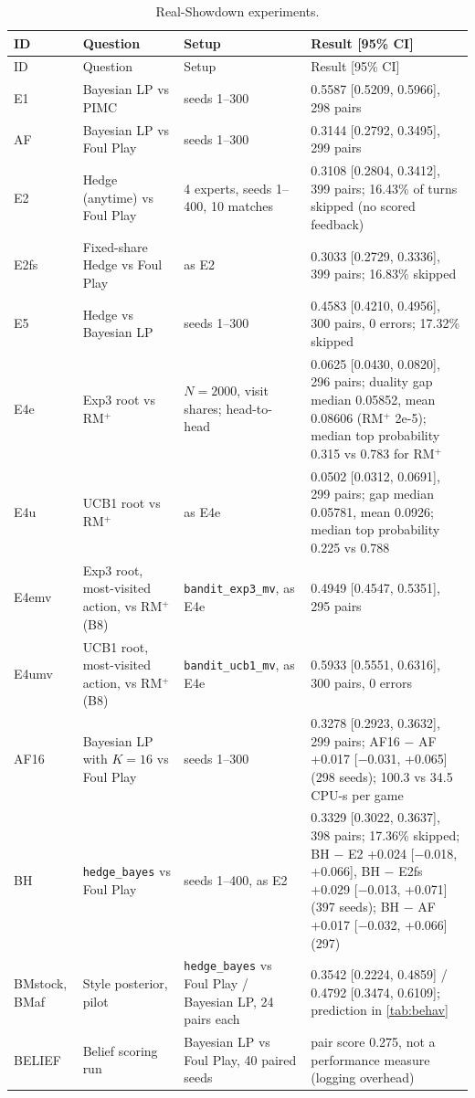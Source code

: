 \documentclass[10pt]{article}
\theoremstyle{plain}
\theoremstyle{definition}
\theoremstyle{remark}
\begin{document}
\begingroup\footnotesize\setlength{\tabcolsep}{3pt}
\begin{longtable}{@{}p{1.25cm}p{3.6cm}p{3.7cm}p{7.5cm}@{}}
\caption{Real-Showdown experiments.}\label{tab:showdown}\\
\toprule ID & Question & Setup & Result [95\% CI] \\ \midrule \endfirsthead
\toprule ID & Question & Setup & Result [95\% CI] \\ \midrule \endhead
E1 & Bayesian LP vs PIMC & seeds 1--300 & 0.5587 [0.5209, 0.5966], 298 pairs \\
AF & Bayesian LP vs Foul Play & seeds 1--300 & 0.3144 [0.2792, 0.3495], 299 pairs \\
E2 & Hedge (anytime) vs Foul Play & 4 experts, seeds 1--400, 10 matches & 0.3108 [0.2804, 0.3412], 399 pairs; 16.43\% of turns skipped (no scored feedback) \\
E2fs & Fixed-share Hedge vs Foul Play & as E2 & 0.3033 [0.2729, 0.3336], 399 pairs; 16.83\% skipped \\
E5 & Hedge vs Bayesian LP & seeds 1--300 & 0.4583 [0.4210, 0.4956], 300 pairs, 0 errors; 17.32\% skipped \\
E4e & Exp3 root vs RM$^+$ & $N=2000$, visit shares; head-to-head & 0.0625 [0.0430, 0.0820], 296 pairs; duality gap median 0.05852, mean 0.08606 (RM$^+$ 2e-5); median top probability 0.315 vs 0.783 for RM$^+$ \\
E4u & UCB1 root vs RM$^+$ & as E4e & 0.0502 [0.0312, 0.0691], 299 pairs; gap median 0.05781, mean 0.0926; median top probability 0.225 vs 0.788 \\
E4emv & Exp3 root, most-visited action, vs RM$^+$ (B8) & \texttt{bandit\_exp3\_mv}, as E4e & 0.4949 [0.4547, 0.5351], 295 pairs \\
E4umv & UCB1 root, most-visited action, vs RM$^+$ (B8) & \texttt{bandit\_ucb1\_mv}, as E4e & 0.5933 [0.5551, 0.6316], 300 pairs, 0 errors \\
AF16 & Bayesian LP with $K=16$ vs Foul Play & seeds 1--300 & 0.3278 [0.2923, 0.3632], 299 pairs; AF16 $-$ AF +0.017 [$-$0.031, +0.065] (298 seeds); 100.3 vs 34.5 CPU-s per game \\
BH & \texttt{hedge\_bayes} vs Foul Play & seeds 1--400, as E2 & 0.3329 [0.3022, 0.3637], 398 pairs; 17.36\% skipped; BH $-$ E2 +0.024 [$-$0.018, +0.066], BH $-$ E2fs +0.029 [$-$0.013, +0.071] (397 seeds); BH $-$ AF +0.017 [$-$0.032, +0.066] (297) \\
BMstock, BMaf & Style posterior, pilot & \texttt{hedge\_bayes} vs Foul Play / Bayesian LP, 24 pairs each & 0.3542 [0.2224, 0.4859] / 0.4792 [0.3474, 0.6109]; prediction in \cref{tab:behav} \\
BELIEF & Belief scoring run & Bayesian LP vs Foul Play, 40 paired seeds & pair score 0.275, not a performance measure (logging overhead) \\
\bottomrule
\end{longtable}
\endgroup
\end{document}
